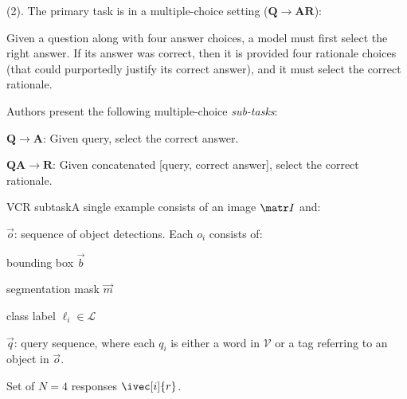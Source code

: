 \documentclass[11pt]{article}
\begin{document}






 (2). The primary task is  in a multiple-choice setting ($\bm{Q \rightarrow AR}$):
\begin{myquote}
	Given a question along with four answer choices, a model must first select the right answer. If its answer was correct, then it is provided four rationale choices (that could purportedly justify its correct answer), and it must select the correct rationale.
\end{myquote}
Authors present the following multiple-choice \textit{sub-tasks}:
\begin{compactitem}
	\item {} $\bm{Q \rightarrow A}$: Given query, select the correct answer.
		
	\item {} $\bm{QA \rightarrow R}$: Given concatenated [query, correct answer], select the correct rationale.
\end{compactitem}

\begin{itemdefinition}{VCR subtask}{A single example consists of an image $\matr I$ and:}
	\item $\vec o$: sequence of object detections. Each $o_i$ consists of:
	\begin{compactitem}
		\item bounding box $\vec b$
		\item segmentation mask $\vec m$
		\item class label $\ell_i \in \mathcal L$
	\end{compactitem}
	
	\item $\vec q$: query sequence, where each $q_i$ is either a word in $\mathcal V$ or a tag referring to an object in $\vec o$.
	
	\item Set of $N=4$ responses $\ivec[i]{r}$.
\end{itemdefinition}
\end{document}
